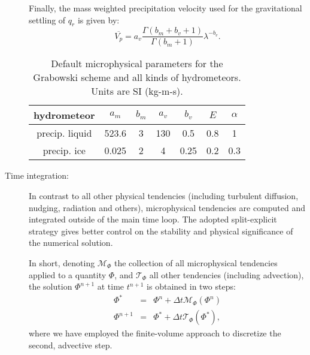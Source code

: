\documentclass[12pt,A4,french]{article}
\begin{document}
\begin{description}
Finally, the mass weighted precipitation velocity used for the gravitational settling of $q_r$ is given by:
\begin{equation}
    \overline{V_p} = a_v\frac{\Gamma\left(b_m + b_v + 1\right)}{\Gamma\left(b_m + 1\right)}\lambda^{-b_v}.
\end{equation}

\begin{table}[!h]
\begin{center}
\begin{tabular}{c|cccccc}
hydrometeor & $a_m$ & $b_m$ & $a_{v}$ & $b_{v}$ & $E$ & $\alpha$ \\
\hline
precip. liquid & 523.6 & 3 & 130 & 0.5 & 0.8 & 1  \\
precip. ice & 0.025 & 2 & 4 & 0.25 & 0.2 & 0.3  \\
\end{tabular}
\end{center}
\caption{Default microphysical parameters for the Grabowski scheme and all kinds of hydrometeors. Units are SI (kg-m-s). }
\label{grab_param}
\end{table}

\item[Time integration:]

In contrast to all other physical tendencies (including turbulent diffusion, nudging, radiation and others), microphysical tendencies are computed and integrated outside of the main time loop. The adopted split-explicit strategy gives better control on the stability and physical significance of the numerical solution.

In short, denoting $\mathcal{M}_\Phi$ the collection of all microphysical tendencies applied to a quantity $\Phi$, and $\mathcal{T}_\Phi$ all other tendencies (including advection), the solution $\Phi^{n+1}$ at time $t^{n+1}$ is obtained in two steps:
\begin{eqnarray}
    \Phi^* &=& \Phi^n + \Delta t \mathcal{M}_\Phi\left(\Phi^n\right) \\
    \Phi^{n+1} &=& \Phi^* + \Delta t \mathcal{T}_\Phi\left(\Phi^*\right),
\end{eqnarray}
where we have employed the finite-volume approach to discretize the second, advective step. 


\end{description}
\end{document}
